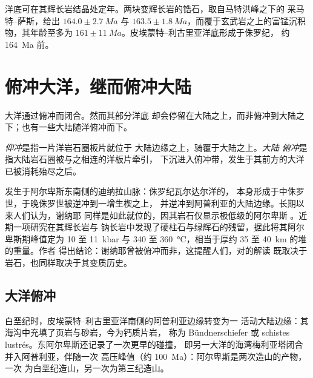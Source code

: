 洋底可在其辉长岩结晶处定年。两块变辉长岩的锆石，取自马特洪峰之下的
采马特–萨斯，给出 $164.0 \pm \qty{2.7}{Ma}$ 与 $163.5
\pm \qty{1.8}{Ma}$，而覆于玄武岩之上的富锰沉积物，其年龄至多为 $161
\pm \qty{11}{Ma}$。皮埃蒙特–利古里亚洋底形成于侏罗纪，
约 \qty{164}{Ma} 前。

\section{俯冲大洋，继而俯冲大陆}\label{sec:b2:alpine-orogen:subduction}

大洋通过俯冲而闭合。然而其部分洋底
却会停留在大陆之上，而非俯冲到大陆之下；也有一些大陆随洋俯冲而下。

\begin{definition}[仰冲；大陆俯冲]\label{def:b2:alpine-orogen:obduction}
\emph{仰冲}是指一片洋岩石圈板片就位于
大陆边缘之上，骑覆于大陆之上。\emph{大陆
俯冲}是指大陆岩石圈被与之相连的洋板片牵引，
下沉进入俯冲带，发生于其前方的大洋
已被消耗殆尽之后。
\end{definition}

发生于阿尔卑斯东南侧的迪纳拉山脉：侏罗纪瓦尔达尔洋的，
本身形成于中侏罗世，于晚侏罗世被逆冲到一增生楔之上，
并逆冲到阿普利亚的大陆边缘。长期以来人们认为，谢纳耶
同样是如此就位的，因其岩石仅显示极低级的阿尔卑斯
。近期一项研究在其辉长岩与
钠长岩中发现了硬柱石与绿辉石的残留，据此将其阿尔卑斯期峰值定为 10 至 \qty{11}{kbar} 与 340 至
\qty{360}{\celsius}，相当于厚约 35 至 \qty{40}{km} 的堆的重量。作者
得出结论：谢纳耶曾被俯冲而非，这提醒人们，对的解读
既取决于岩石，也同样取决于其变质历史。

\subsection*{大洋俯冲}

白垩纪时，皮埃蒙特–利古里亚洋南侧的阿普利亚边缘转变为一
活动大陆边缘：其海沟中充填了页岩与砂岩，今为钙质片岩，
称为 Bündnerschiefer 或 schistes lustrés。东阿尔卑斯还记录了一次更早的碰撞，
即另一大洋的海湾梅利亚塔闭合并入阿普利亚，伴随一次
高压峰值（约 \qty{100}{Ma}）：阿尔卑斯是两次造山的产物，一次
为白垩纪造山，另一次为第三纪造山。

